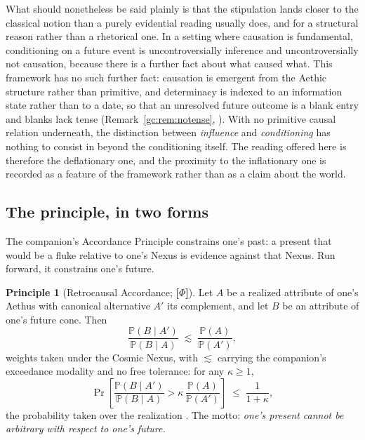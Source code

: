 \documentclass[11pt]{article}
\numberwithin{equation}{section}
\theoremstyle{plain}
\theoremstyle{definition}
\newtheorem{principle}{Principle}
\theoremstyle{remark}
\newcommand{\PP}{\mathbb{P}}
\begin{document}
What should nonetheless be said plainly is that the stipulation lands
closer to the classical notion than a purely evidential reading usually
does, and for a structural reason rather than a rhetorical one. In a
setting where causation is fundamental, conditioning on a future event
is uncontroversially inference and uncontroversially not causation,
because there is a further fact about what caused what. This framework
has no such further fact: causation is emergent from the Aethic
structure rather than primitive, and determinacy is indexed to an
information state rather than to a date, so that an unresolved future
outcome is a blank entry and blanks lack tense
(Remark~\ref{gc:rem:notense}, \cite{AethusDecision}). With no primitive
causal relation underneath, the distinction between \emph{influence} and
\emph{conditioning} has nothing to consist in beyond the conditioning
itself. The reading offered here is therefore the deflationary one, and
the proximity to the inflationary one is recorded as a feature of the
framework rather than as a claim about the world.

\subsection{The principle, in two forms}\label{gc:sub:retroaccord}

The companion's
Accordance Principle constrains one's past: a present that would be a
fluke relative to one's Nexus is evidence against that Nexus. Run
forward, it constrains one's future.

\begin{principle}[Retrocausal Accordance; \textbf{[$\Phi$]}]
\label{gc:prin:retroaccord}
Let $A$ be a realized attribute of one's Aethus with canonical
alternative $A'$ its complement, and let $B$ be an attribute of one's
future cone. Then
\begin{equation}\label{gc:eq:retroaccord}
\frac{\PP(B\mid A')}{\PP(B\mid A)}\;\lesssim\;\frac{\PP(A)}{\PP(A')},
\end{equation}
weights taken under the Cosmic Nexus, with $\lesssim$ carrying the
companion's exceedance modality and no free tolerance: for any
$\kappa\ge1$,
\begin{equation}\label{gc:eq:retroexceed}
\Pr\left[\frac{\PP(B\mid A')}{\PP(B\mid A)}
>\kappa\,\frac{\PP(A)}{\PP(A')}\right]\;\le\;\frac{1}{1+\kappa},
\end{equation}
the probability taken over the realization \cite{NexicFoundation}. The
motto: \emph{one's present cannot be arbitrary with respect to one's
future.}
\end{principle}
\end{document}
